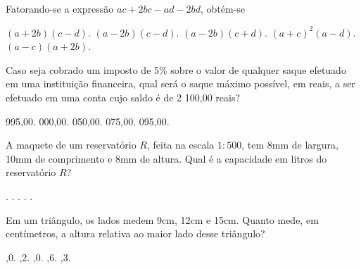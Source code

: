 \begin{question}%
Fatorando-se a expressão \(ac + 2bc - ad -2bd\), obtém-se
    \begin{tasks}
        \task \((a+2b)(c-d)\).
        \task \((a-2b)(c-d)\).
        \task \((a-2b)(c+d)\).
        \task \((a+c)^2(a-d)\).
        \task \((a-c)(a+2b)\).
    \end{tasks}
\end{question}

\begin{question}%
Caso seja cobrado um imposto de 5\% sobre o valor de qualquer saque efetuado em uma instituição financeira, qual será o saque máximo possível, em reais, a ser efetuado em uma conta cujo saldo é de 2 100,00 reais?
    \begin{tasks}
         995,00.
         000,00.
         050,00.
         075,00.
         095,00.
    \end{tasks}
\end{question}

\begin{question}%
A maquete de um reservatório \(R\), feita na escala \(1:500\), tem 8mm de largura, 10mm de comprimento e 8mm de altura. Qual é a capacidade em litros do reservatório \(R\)?
    \begin{tasks}
        .
        .
        .
        .
        .
    \end{tasks}
\end{question}

\begin{question}%
Em um triângulo, os lados medem 9cm, 12cm e 15cm. Quanto mede, em centímetros, a altura relativa ao maior lado desse triângulo?
    \begin{tasks}
        ,0.
        ,2.
        ,0.
        ,6.
        ,3.
    \end{tasks}
\end{question}

